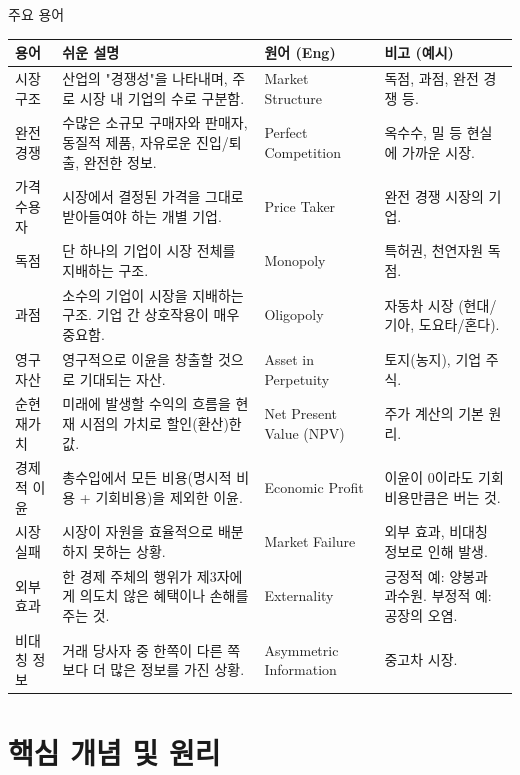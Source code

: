 \documentclass[11pt,a4paper]{book}
\theoremstyle{definition}
\begin{document}
\begin{mybox}{주요 용어}
\small
\begin{tabularx}{\textwidth}{@{}>{\raggedright\arraybackslash}p{2.5cm} >{\raggedright\arraybackslash}X >{\raggedright\arraybackslash}p{2.8cm} >{\raggedright\arraybackslash}p{3cm}@{}}
\toprule
\textbf{용어} & \textbf{쉬운 설명} & \textbf{원어 (Eng)} & \textbf{비고 (예시)} \\
\midrule
시장 구조 & 산업의 "경쟁성"을 나타내며, 주로 시장 내 기업의 수로 구분함. & Market Structure & 독점, 과점, 완전 경쟁 등. \\
완전 경쟁 & 수많은 소규모 구매자와 판매자, 동질적 제품, 자유로운 진입/퇴출, 완전한 정보. & Perfect Competition & 옥수수, 밀 등 현실에 가까운 시장. \\
가격 수용자 & 시장에서 결정된 가격을 그대로 받아들여야 하는 개별 기업. & Price Taker & 완전 경쟁 시장의 기업. \\
독점 & 단 하나의 기업이 시장 전체를 지배하는 구조. & Monopoly & 특허권, 천연자원 독점. \\
과점 & 소수의 기업이 시장을 지배하는 구조. 기업 간 상호작용이 매우 중요함. & Oligopoly & 자동차 시장 (현대/기아, 도요타/혼다). \\
영구 자산 & 영구적으로 이윤을 창출할 것으로 기대되는 자산. & Asset in Perpetuity & 토지(농지), 기업 주식. \\
순현재가치 & 미래에 발생할 수익의 흐름을 현재 시점의 가치로 할인(환산)한 값. & Net Present Value (NPV) & 주가 계산의 기본 원리. \\
경제적 이윤 & 총수입에서 모든 비용(명시적 비용 + 기회비용)을 제외한 이윤. & Economic Profit & 이윤이 0이라도 기회비용만큼은 버는 것. \\
시장 실패 & 시장이 자원을 효율적으로 배분하지 못하는 상황. & Market Failure & 외부 효과, 비대칭 정보로 인해 발생. \\
외부 효과 & 한 경제 주체의 행위가 제3자에게 의도치 않은 혜택이나 손해를 주는 것. & Externality & 긍정적 예: 양봉과 과수원. 부정적 예: 공장의 오염. \\
비대칭 정보 & 거래 당사자 중 한쪽이 다른 쪽보다 더 많은 정보를 가진 상황. & Asymmetric Information & 중고차 시장. \\
\bottomrule
\end{tabularx}
\end{mybox}


\section{핵심 개념 및 원리}
\end{document}
